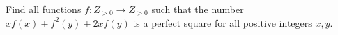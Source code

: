Find all functions $f :Z_{>0} \to Z_{>0}$ such that the number $xf(x) + f ^2(y) + 2xf(y)$ is a perfect square for all positive integers $x,y$.